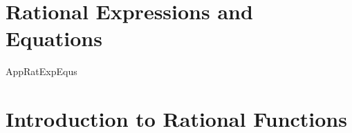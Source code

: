 \section{Rational Expressions and Equations}

{AppRatExpEqus}


\section{Introduction to Rational Functions}



\newpage

\begin{comment}

\section{Graphs of Rational Functions}



\newpage

\section{Inequalities involving Rational Functions and Applications}



\newpage
\end{comment}
